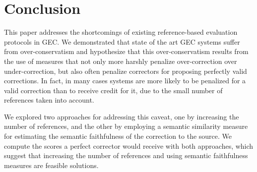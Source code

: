 \documentclass[letter,11pt]{article}
\begin{document}
\section{Conclusion}

This paper addresses the shortcomings of existing reference-based evaluation protocols in GEC.
We demonstrated that state of the art GEC systems suffer from over-conservatism and
hypothesize that this over-conservatism results from the use of measures that
not only more harshly penalize over-correction over under-correction,
but also often penalize correctors for proposing perfectly valid corrections.
In fact, in many cases systems are more likely to be penalized for 
a valid correction than to receive credit for it, due to the small number of references
taken into account.

We explored two approaches for addressing this caveat, one by
increasing the number of references, and the other by employing a semantic similarity
measure for estimating the semantic faithfulness of the correction to the source.
We compute the scores a perfect corrector would receive with both approaches,
which suggest that increasing the number of references and using semantic faithfulness
measures are feasible solutions.


\end{document}
